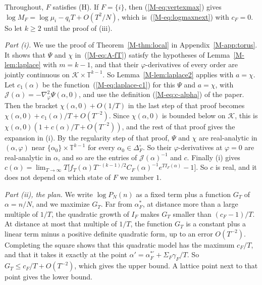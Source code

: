\documentclass[EJP,preprint]{ejpecp}
\newcommand{\mref}[1]{\ref*{M-#1}}
\newcommand{\meqref}[1]{(\mref{#1})}
\begin{document}
Throughout, $F$ satisfies (H). If $F=\{i\}$, then
\meqref{eq:vertexmax} gives $\log M_F=\log\mu_i-q_iT+O(T^2/N)$, which
is~\meqref{eq:logmaxnext} with $c_F=0$. So let $k\ge2$ until the proof of
(iii).

\emph{Part \textup{(i)}.} We use the proof of Theorem~\mref{thm:local} in
Appendix~\mref{app:torus}. It shows that $\Psi$ and $\chi$ in~\meqref{eq:A-fT}
satisfy the hypotheses of Lemma~\mref{lem:laplace} with $m=k-1$, and that their
$\varphi$-derivatives of every order are jointly continuous on
$\mathcal K\times\mathbb T^{k-1}$. So Lemma~\mref{lem:laplace2} applies with
$a=\chi$. Let $c_1(\alpha)$ be the function~\meqref{eq:laplace-c1} for this
$\Psi$ and $a=\chi$, with
$\mathcal J(\alpha)=-\nabla^2_\varphi\Psi(\alpha,0)$, and use the definition \meqref{eq:c-alpha} of the paper.
Then the bracket $\chi(\alpha,0)+O(1/T)$ in the last step of that proof
becomes $\chi(\alpha,0)+c_1(\alpha)/T+O(T^{-2})$. Since $\chi(\alpha,0)$ is
bounded below on $\mathcal K$, this is
$\chi(\alpha,0)(1+c(\alpha)/T+O(T^{-2}))$, and the rest of that proof gives
the expansion in (i). By the regularity step of that proof, $\Psi$ and $\chi$
are real-analytic in $(\alpha,\varphi)$ near
$\{\alpha_0\}\times\mathbb T^{k-1}$ for every $\alpha_0\in\Delta_F^\circ$. So
their $\varphi$-derivatives at $\varphi=0$ are real-analytic in $\alpha$, and
so are the entries of $\mathcal J(\alpha)^{-1}$ and $c$. Finally (i) gives
$c(\alpha)=\lim_{T\to\infty}T\bigl[f_T(\alpha)T^{-(k-1)/2}C_F(\alpha)^{-1}
e^{TI_F(\alpha)}-1\bigr]$. So $c$ is real, and it does not depend on which
state of $F$ we number $1$.

\emph{Part \textup{(ii)}, the plan.} We write $\log P_N(n)$ as a fixed term plus a function
$G_T$ of $\alpha=n/N$, and we maximize $G_T$. Far from $\alpha^*_F$, at distance more than a
large multiple of $1/T$, the quadratic growth of $I_F$ makes $G_T$ smaller than $(c_F-1)/T$.
At distance at most that multiple of $1/T$, the function $G_T$ is a constant plus a linear term
minus a positive definite quadratic form, up to an error $O(T^{-2})$. Completing the square shows
that this quadratic model has the maximum $c_F/T$, and that it takes it exactly at the point
$\alpha'=\alpha^{*\prime}_F+\Sigma_F\gamma_F/T$. So $G_T\le c_F/T+O(T^{-2})$, which gives the upper
bound. A lattice point next to that point gives the lower bound.
\end{document}
